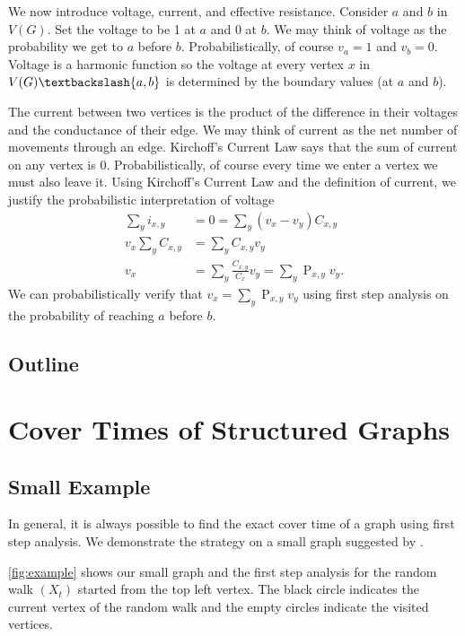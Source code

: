 \documentclass[12pt]{article}
\theoremstyle{definition}
\DeclareMathOperator{\pr}{\mathrm{P}}		     %
\begin{document}
We now introduce voltage, current, and effective resistance.
Consider $a$ and $b$ in $V(G)$.
Set the voltage to be 1 at $a$ and 0 at $b$.
We may think of voltage as the probability we get to $a$ before $b$.
Probabilistically, of course $v_a = 1$ and $v_b=0$.
Voltage is a harmonic function so the voltage at every vertex $x$ in 
$V(G) \textbackslash \{a,b\}$ is determined by the boundary values
(at $a$ and $b$).

The current between two vertices is the product of the
difference in their voltages and the conductance of their edge.
We may think of current as the net number of movements through an edge.
Kirchoff's Current Law says that the sum of current on any vertex is 0.
Probabilistically, of course every time we enter a vertex we must also leave it.
Using Kirchoff's Current Law and the definition of current,
we justify the probabilistic interpretation of voltage
\begin{align}
\sum_y i_{x,y} &= 0 = \sum_y (v_x - v_y)C_{x,y} \nonumber \\
v_x \sum_y C_{x,y} &= \sum_y C_{x,y} v_y \nonumber \\
v_x &= \sum_y \frac{C_{x,y}}{C_x} v_y = \sum_y \pr_{x,y} v_y. \nonumber
\end{align}
We can probabilistically verify that $v_x = \sum_y \pr_{x,y} v_y$
using first step analysis on the probability of reaching $a$ before $b$.

\subsection{Outline}


\section{Cover Times of Structured Graphs}

\subsection{Small Example}
In general, it is always possible to find the exact cover time
of a graph using first step analysis.
We demonstrate the strategy on a small graph suggested by \cite{BH94}.

\cref{fig:example} shows our small graph and the first step analysis
for the random walk $(X_t)$ started from the top left vertex.
The black circle indicates the current vertex of the random walk
and the empty circles indicate the visited vertices.
\end{document}
